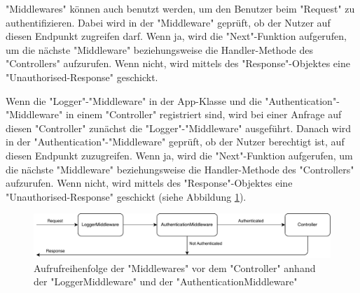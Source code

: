 
"Middlewares" können auch benutzt werden, um den Benutzer beim "Request" zu \mbox{authentifizieren}.
Dabei wird in der "Middleware" geprüft, ob der Nutzer auf diesen Endpunkt zugreifen darf. Wenn ja, wird die "Next"-Funktion aufgerufen, um die nächste "Middleware" beziehungsweise die Handler-Methode des "Controllers" aufzurufen. Wenn nicht, wird mittels des "Response"-Objektes eine "Unauthorised-Response" geschickt.

Wenn die "Logger"-"Middleware" in der App-Klasse und die "Authentication"-"Middleware" in einem "Controller" registriert sind, wird bei einer Anfrage auf diesen "Controller" zunächst die "Logger"-"Middleware" ausgeführt. Danach wird in der "Authentication"-"Middleware" geprüft, ob der Nutzer berechtigt ist, auf diesen Endpunkt zuzugreifen. Wenn ja, wird die "Next"-Funktion aufgerufen, um die nächste "Middleware" beziehungsweise die Handler-Methode des "Controllers" aufzurufen. Wenn nicht, wird mittels des "Response"-Objektes eine "Unauthorised-Response" geschickt (siehe Abbildung \ref{fig:authMiddleware}).

\begin{figure}[H]
    \centering
    \includegraphics[width=15cm]{media/APITemplate/AuthMiddleware.svg.pdf}
    \caption{Aufrufreihenfolge der "Middlewares" vor dem "Controller" anhand der "LoggerMiddleware" und der "AuthenticationMiddleware" } 
    \label{fig:authMiddleware}
\end{figure}

